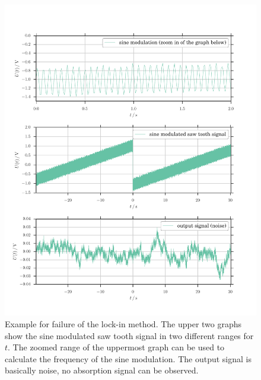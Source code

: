 \begin{figure}
	\includegraphics[width=\textwidth]{figures/example.pdf}
	\caption{
		Example for failure of the lock-in method.
		The upper two graphs show the sine modulated saw tooth signal
		in two different ranges for $t$. The zoomed range of the uppermost 
		graph can be used to calculate the frequency of the sine modulation.
		The output signal is basically noise, no absorption signal can be observed.
		}
	\label{fig:example}
\end{figure}


